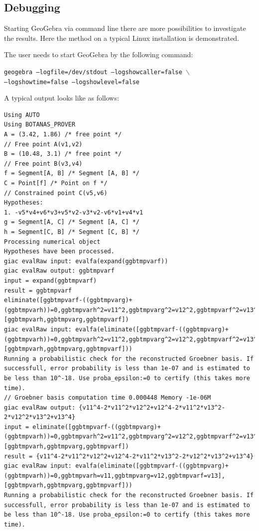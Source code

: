 \documentclass{article}
\begin{document}
\subsection{Debugging}
Starting GeoGebra via command line there are more possibilities to investigate the results. Here the method on a typical Linux installation is demonstrated.

The user needs to start GeoGebra by the following command:
{
    \begin{center}
        \texttt{geogebra --logfile=/dev/stdout --logshowcaller=false $\backslash$\\ --logshowtime=false --logshowlevel=false} 
    \end{center}
} %
A typical output looks like as follows:
{
\scriptsize
\begin{lstlisting}[language=mylog]
Using AUTO
Using BOTANAS_PROVER
A = (3.42, 1.86) /* free point */
// Free point A(v1,v2)
B = (10.48, 3.1) /* free point */
// Free point B(v3,v4)
f = Segment[A, B] /* Segment [A, B] */
C = Point[f] /* Point on f */
// Constrained point C(v5,v6)
Hypotheses:
1. -v5*v4+v6*v3+v5*v2-v3*v2-v6*v1+v4*v1
g = Segment[A, C] /* Segment [A, C] */
h = Segment[C, B] /* Segment [C, B] */
Processing numerical object
Hypotheses have been processed.
giac evalRaw input: evalfa(expand(ggbtmpvarf))
giac evalRaw output: ggbtmpvarf
input = expand(ggbtmpvarf)
result = ggbtmpvarf
eliminate([ggbtmpvarf-((ggbtmpvarg)+(ggbtmpvarh))=0,ggbtmpvarh^2=v11^2,ggbtmpvarg^2=v12^2,ggbtmpvarf^2=v13^2],[ggbtmpvarh,ggbtmpvarg,ggbtmpvarf])
giac evalRaw input: evalfa(eliminate([ggbtmpvarf-((ggbtmpvarg)+(ggbtmpvarh))=0,ggbtmpvarh^2=v11^2,ggbtmpvarg^2=v12^2,ggbtmpvarf^2=v13^2],[ggbtmpvarh,ggbtmpvarg,ggbtmpvarf]))
Running a probabilistic check for the reconstructed Groebner basis. If successfull, error probability is less than 1e-07 and is estimated to be less than 10^-18. Use proba_epsilon:=0 to certify (this takes more time).
// Groebner basis computation time 0.000448 Memory -1e-06M
giac evalRaw output: {v11^4-2*v11^2*v12^2+v12^4-2*v11^2*v13^2-2*v12^2*v13^2+v13^4}
input = eliminate([ggbtmpvarf-((ggbtmpvarg)+(ggbtmpvarh))=0,ggbtmpvarh^2=v11^2,ggbtmpvarg^2=v12^2,ggbtmpvarf^2=v13^2],[ggbtmpvarh,ggbtmpvarg,ggbtmpvarf])
result = {v11^4-2*v11^2*v12^2+v12^4-2*v11^2*v13^2-2*v12^2*v13^2+v13^4}
giac evalRaw input: evalfa(eliminate([ggbtmpvarf-((ggbtmpvarg)+(ggbtmpvarh))=0,ggbtmpvarh=v11,ggbtmpvarg=v12,ggbtmpvarf=v13],[ggbtmpvarh,ggbtmpvarg,ggbtmpvarf]))
Running a probabilistic check for the reconstructed Groebner basis. If successfull, error probability is less than 1e-07 and is estimated to be less than 10^-18. Use proba_epsilon:=0 to certify (this takes more time).

\end{lstlisting}}
\end{document}
